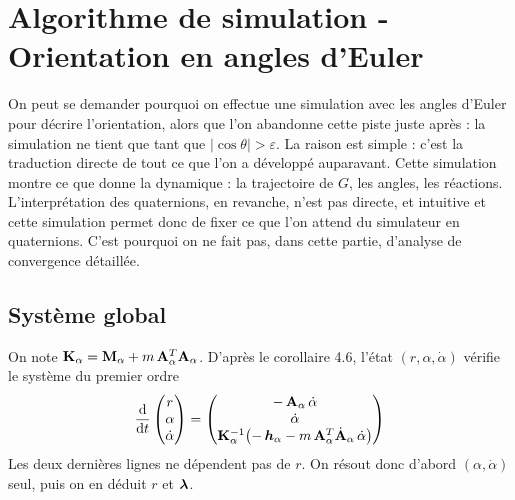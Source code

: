 
\section{Algorithme de simulation - Orientation en angles d'Euler}
On peut se demander pourquoi on effectue une simulation avec les angles
d'Euler pour décrire l'orientation, alors que l'on abandonne cette
piste juste après : la simulation ne tient que tant que
$|\cos\theta| > \varepsilon$. La raison est simple : c'est la
traduction directe de tout ce que l'on a développé auparavant. Cette
simulation montre ce que donne la dynamique : la trajectoire de $G$,
les angles, les réactions. L'interprétation des quaternions, en
revanche, n'est pas directe, et intuitive et cette simulation permet donc de fixer
ce que l'on attend du simulateur en quaternions. C'est pourquoi on ne
fait pas, dans cette partie, d'analyse de convergence détaillée.
\subsection{Système global}

On note $\mathbf{K}_\alpha = \mathbf{M}_\alpha + m\,\mathbf{A}_\alpha^T\mathbf{A}_\alpha$.
D'après le corollaire 4.6, l'état $(r,\alpha,\dot\alpha)$ vérifie le
système du premier ordre
\[
    \frac{\mathrm{d}}{\mathrm{d} t}\begin{pmatrix} r\\ \alpha\\ \dot\alpha \end{pmatrix}
    = \begin{pmatrix}
        -\,\mathbf{A}_\alpha\,\dot\alpha\\
        \dot\alpha\\
        \mathbf{K}_\alpha^{-1}\bigl(-\,\bm{h}_\alpha
        - m\,\mathbf{A}_\alpha^T\dot{\mathbf{A}}_\alpha\,\dot\alpha\bigr)
    \end{pmatrix}
\]
Les deux dernières lignes ne dépendent pas de $r$. On résout donc
d'abord $(\alpha,\dot\alpha)$ seul, puis on en déduit $r$ et
$\bm{\lambda}$.

